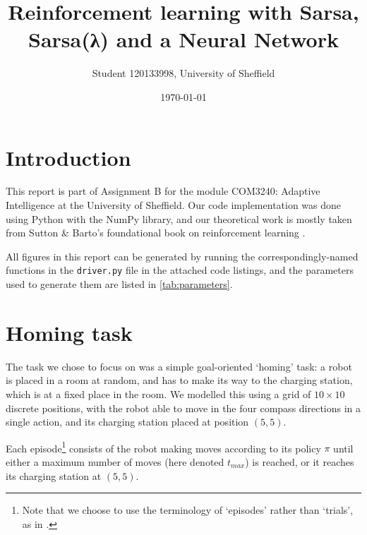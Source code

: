 \documentclass[a4paper, 11pt, twocolumn, final]{article} %
\title{Reinforcement learning with Sarsa, Sarsa(λ) and a Neural Network}
\author{Student 120133998, University of Sheffield}
\date{\today}
\begin{document}

\section{Introduction} This report is part of Assignment B for the module
COM3240: Adaptive Intelligence at the University of Sheffield.  Our code
implementation was done using Python with the NumPy \cite{NumPy} library, and
our theoretical work is mostly taken from Sutton \& Barto's foundational book on
reinforcement learning \cite{Sutton1998}.

All figures in this report can be generated by running the correspondingly-named
functions in the \texttt{driver.py} file in the attached code listings, and the
parameters used to generate them are listed in \autoref{tab:parameters}.

\section{Homing task} The task we chose to focus on was a simple goal-oriented
`homing' task: a robot is placed in a room at random, and has to make its way to
the charging station, which is at a fixed place in the room.  We modelled this
using a grid of $10\times10$ discrete positions, with the robot able to move in
the four compass directions in a single action, and its charging station placed
at position $(5, 5)$.

Each episode\footnote{Note that we choose to use the terminology of `episodes'
rather than `trials', as in \cite[p.~58]{Sutton1998}.} consists of the robot
making moves according to its policy $\pi$ until either a maximum number of
moves (here denoted $t_{max}$) is reached, or it reaches its charging station at
$(5, 5)$.
\end{document}
